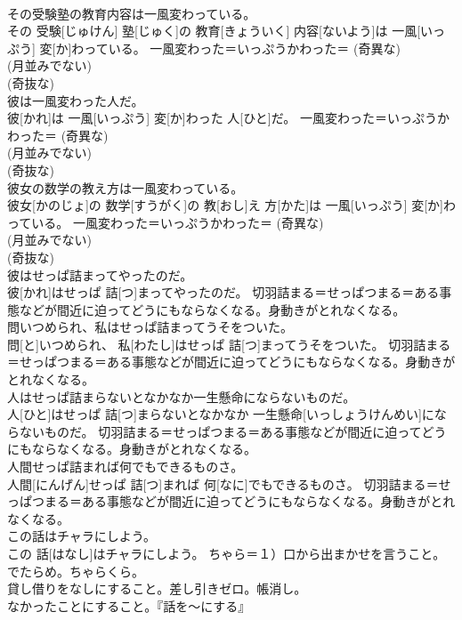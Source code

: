 \documentclass[8pt]{extreport}
\begin{document}
\begin{CJK}{UTF8}{min}
{\\	その受験塾の教育内容は一風変わっている。	
\\	その 受験[じゅけん] 塾[じゅく]の 教育[きょういく] 内容[ないよう]は 一風[いっぷう] 変[か]わっている。	一風変わった＝いっぷうかわった＝ (奇異な) 
\\	(月並みでない) 
\\	(奇抜な) 
\\	彼は一風変わった人だ。	
\\	彼[かれ]は 一風[いっぷう] 変[か]わった 人[ひと]だ。	一風変わった＝いっぷうかわった＝ (奇異な) 
\\	(月並みでない) 
\\	(奇抜な) 
\\	彼女の数学の教え方は一風変わっている。	
\\	彼女[かのじょ]の 数学[すうがく]の 教[おし]え 方[かた]は 一風[いっぷう] 変[か]わっている。	一風変わった＝いっぷうかわった＝ (奇異な) 
\\	(月並みでない) 
\\	(奇抜な) 
\\	彼はせっぱ詰まってやったのだ。	
\\	彼[かれ]はせっぱ 詰[つ]まってやったのだ。	切羽詰まる＝せっぱつまる＝ある事態などが間近に迫ってどうにもならなくなる。身動きがとれなくなる。
\\	問いつめられ、私はせっぱ詰まってうそをついた。	
\\	問[と]いつめられ、 私[わたし]はせっぱ 詰[つ]まってうそをついた。	切羽詰まる＝せっぱつまる＝ある事態などが間近に迫ってどうにもならなくなる。身動きがとれなくなる。
\\	人はせっぱ詰まらないとなかなか一生懸命にならないものだ。	
\\	人[ひと]はせっぱ 詰[つ]まらないとなかなか 一生懸命[いっしょうけんめい]にならないものだ。	切羽詰まる＝せっぱつまる＝ある事態などが間近に迫ってどうにもならなくなる。身動きがとれなくなる。
\\	人間せっぱ詰まれば何でもできるものさ。	
\\	人間[にんげん]せっぱ 詰[つ]まれば 何[なに]でもできるものさ。	切羽詰まる＝せっぱつまる＝ある事態などが間近に迫ってどうにもならなくなる。身動きがとれなくなる。
\\	この話はチャラにしよう。	
\\	この 話[はなし]はチャラにしよう。	ちゃら＝１）口から出まかせを言うこと。でたらめ。ちゃらくら。 　　　　
\\	貸し借りをなしにすること。差し引きゼロ。帳消し。 　　　　
\\	なかったことにすること。『話を〜にする』
}
\end{CJK}
\end{document}
